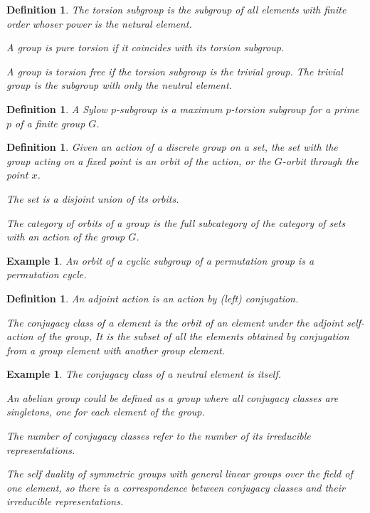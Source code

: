 \documentclass{tufte-book}
\newtheorem{definition}[theorem]{Definition}
\newtheorem{example}[theorem]{Example}
\begin{document}
\begin{definition}
  The torsion subgroup is the subgroup of all elements with finite order whoser power is the netural element.

  A group is pure torsion if it coincides with its torsion subgroup.

  A group is torsion free if the torsion subgroup is the trivial group. The trivial group is the subgroup with only the neutral element.
\end{definition}

\begin{definition}
  A Sylow $p$-subgroup is a maximum $p$-torsion subgroup for a prime $p$ of a finite group $G$.
\end{definition}

\begin{definition}
  Given an action of a discrete group on a set, the set with the group acting on a fixed point is an orbit of the action, or the $G$-orbit through the point $x$.

  The set is a disjoint union of its orbits.

  The category of orbits of a group is the full subcategory of the category of sets with an action of the group $G$.
\end{definition}

\begin{example}
  An orbit of a cyclic subgroup of a permutation group is a permutation cycle.
\end{example}

\begin{definition}
  An adjoint action is an action by (left) conjugation.

  The conjugacy class of a element is the orbit of an element under the adjoint self-action of the group, It is the subset of all the elements obtained by conjugation from a group element with another group element.
\end{definition}

\begin{example}
  The conjugacy class of a neutral element is itself.

  An abelian group could be defined as a group where all conjugacy classes are singletons, one for each element of the group.

  The number of conjugacy classes refer to the number of its irreducible representations.

  The self duality of symmetric groups with general linear groups over the field of one element, so there is a correspondence between conjugacy classes and their irreducible representations.
\end{example}
\end{document}
